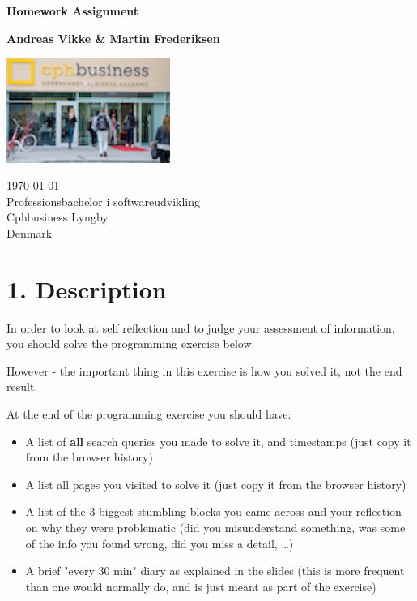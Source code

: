 \documentclass[10pt]{report}
\date{}
\begin{document}
\begin{titlepage}
  \begin{center}
    \vspace*{1cm}

    \Huge
    \textbf{Homework Assignment}
         
    \vspace{1.5cm}

    \LARGE
    \textbf{Andreas Vikke \& Martin Frederiksen}

    \vfill
  
    \includegraphics[width=0.4\textwidth]{7fe3c3f6-Stego}
    
    \vfill
    
    \Large
    \today\\
    Professionsbachelor i softwareudvikling\\
    Cphbusiness Lyngby\\
    Denmark
         
  \end{center}
\end{titlepage}

\chapter*{1. Description}
\pagestyle{fancy}
In order to look at self reflection and to judge your assessment of information, you should solve the programming exercise below.

However - the important thing in this exercise is how you solved it, not the end result.

At the end of the programming exercise you should have:

\begin{itemize}
\item A list of \textbf{all} search queries you made to solve it, and timestamps (just copy it from the browser history)
\item A list all pages you visited to solve it (just copy it from the browser history)
\item A list of the 3 biggest stumbling blocks you came across and your reflection on why they were problematic (did you misunderstand something, was some of the info you found wrong, did you miss a detail, …)
\item A brief "every 30 min" diary as explained in the slides (this is more frequent than one would normally do, and is just meant as part of the exercise)
\end{itemize}
\end{document}
